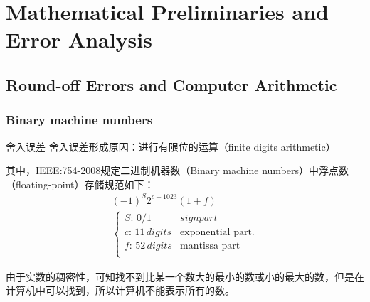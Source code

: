 \section{Mathematical Preliminaries and Error Analysis}
\subsection{Round-off Errors and Computer Arithmetic}
\subsubsection{Binary machine numbers}
\begin{defn}{舍入误差}
舍入误差形成原因：进行有限位的运算（finite digits arithmetic）\par
其中，IEEE:754-2008规定二进制机器数（Binary machine numbers）中浮点数（floating-point）存储规范如下：
    \begin{align*}
    (-1)^S2^{c-1023}(1+f) \\
    \begin{cases}
        S:\, 0/1 & sign part \\
        c:\, 11\,digits & \text{exponential part.} \\
        f:\, 52\,digits & \text{mantissa part} \\
    \end{cases}
    \end{align*}
\end{defn}\par
由于实数的稠密性，可知找不到比某一个数大的最小的数或小的最大的数，但是在计算机中可以找到，所以计算机不能表示所有的数。

